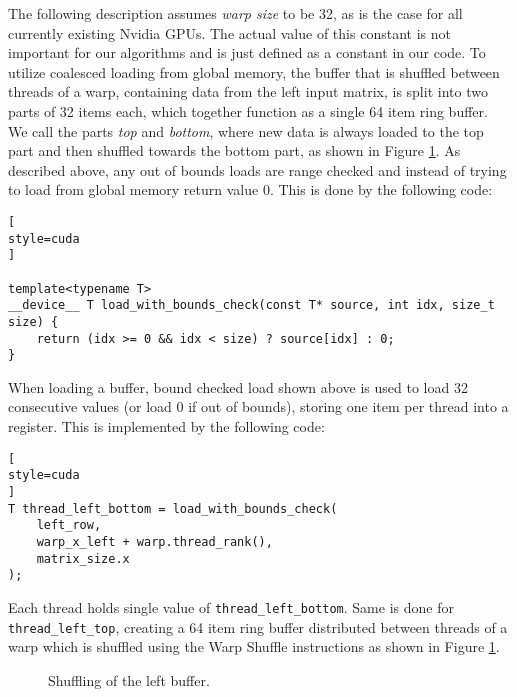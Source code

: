
The following description assumes \textit{warp size} to be 32, as is the case for all currently existing Nvidia GPUs. The actual value of this constant is not important for our algorithms and is just defined as a constant in our code. To utilize coalesced loading from global memory, the buffer that is shuffled between threads of a warp, containing data from the left input matrix, is split into two parts of 32 items each, which together function as a single 64 item ring buffer. We call the parts \textit{top} and \textit{bottom}, where new data is always loaded to the top part and then shuffled towards the bottom part, as shown in Figure \ref{fig:shuffle_buffer}. As described above, any out of bounds loads are range checked and instead of trying to load from global memory return value 0. This is done by the following code:
\begin{lstlisting}[
style=cuda
]

template<typename T>
__device__ T load_with_bounds_check(const T* source, int idx, size_t size) {
	return (idx >= 0 && idx < size) ? source[idx] : 0;
}
\end{lstlisting}


When loading a buffer, bound checked load shown above is used to load 32 consecutive values (or load 0 if out of bounds), storing one item per thread into a register. This is implemented by the following code:
\begin{lstlisting}[
style=cuda
]
T thread_left_bottom = load_with_bounds_check(
	left_row,
	warp_x_left + warp.thread_rank(),
	matrix_size.x
);

\end{lstlisting}

Each thread holds single value of \texttt{thread\_left\_bottom}. Same is done for \texttt{thread\_left\_top}, creating a 64 item ring buffer distributed between threads of a warp which is shuffled using the Warp Shuffle instructions as shown in Figure \ref{fig:shuffle_buffer}.

\begin{figure}[ht]
	\centering
	\def\svgwidth{\textwidth}
	
	\caption{Shuffling of the left buffer.}
	\label{fig:shuffle_buffer}
\end{figure}

